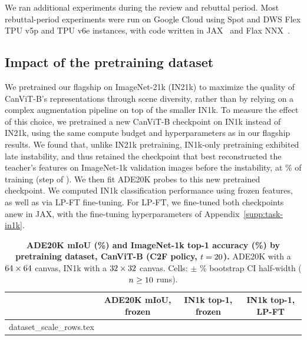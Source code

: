 \documentclass{article}
\makeatletter
\newcommand{\inputrows}[1]{\@@input #1 }
\makeatother
\begin{document}
We ran additional experiments during the review and rebuttal period.
Most rebuttal-period experiments were run on Google Cloud using Spot and DWS Flex TPU v5p and TPU v6e instances, with code written in JAX~\cite{jax2018github} and Flax NNX~\cite{flax2020github}.

\FloatBarrier
\subsection{Impact of the pretraining dataset}
\label{supp:dataset-scale}

We pretrained our flagship on ImageNet-21k (IN21k) to maximize the quality of CanViT-B's representations through scene diversity, rather than by relying on a complex augmentation pipeline on top of the smaller IN1k.
To measure the effect of this choice, we pretrained a new CanViT-B checkpoint on IN1k instead of IN21k, using the same compute budget and hyperparameters as in our flagship results.
We found that, unlike IN21k pretraining, IN1k-only pretraining exhibited late instability, and thus retained the checkpoint that best reconstructed the teacher's features on ImageNet-1k validation images before the instability, at \dsInOneStepPct\% of training (step \dsInOneStep{} of \dsSchedule{}).
We then fit ADE20K probes to this new pretrained checkpoint.
We computed IN1k classification performance using frozen features, as well as via LP-FT fine-tuning.
For LP-FT, we fine-tuned both checkpoints anew in JAX, with the fine-tuning hyperparameters of Appendix~\ref{supp:task-in1k}.

\begin{table}[h]
  \caption{\textbf{ADE20K mIoU (\%) and ImageNet-1k top-1 accuracy (\%) by pretraining dataset, CanViT-B (C2F policy, $t = 20$).}
  ADE20K with a $64 \times 64$ canvas, IN1k with a $32 \times 32$ canvas.
  Cells: $\pm$ \bootstrapCiPct\% bootstrap CI half-width ($n \geq 10$ runs).}
  \label{tab:dataset-scale}
  \centering
  \small
  \begin{tabular}{lccc}
    \toprule
    & \textbf{ADE20K mIoU, frozen} & \textbf{IN1k top-1, frozen} & \textbf{IN1k top-1, LP-FT} \\
    \midrule
    \inputrows{dataset_scale_rows.tex}
    \bottomrule
  \end{tabular}
\end{table}
\end{document}
